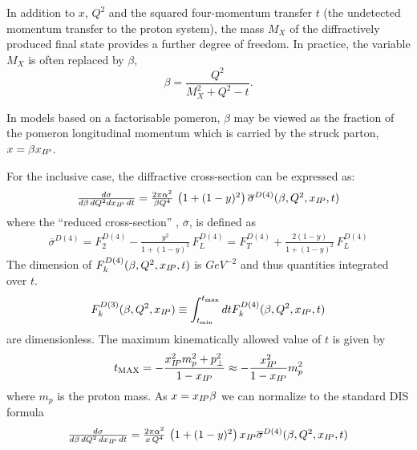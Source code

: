 In addition to $x$, $Q^2$ and the squared four-momentum transfer $t$
(the undetected momentum transfer to the proton system),
the mass $M_X$ of the diffractively produced final state provides
 a further degree of freedom. In practice, the variable $M_X$ is often replaced by $\beta$,
\begin{equation}
\beta=\frac{Q^2}{M_X^2+Q^2-t}.
\end{equation}

In models based on a factorisable pomeron, $\beta$ may be viewed as the fraction of the
pomeron longitudinal momentum which is carried by the struck parton, $x=\beta x_{{I\!P}}$.

For the inclusive case, the diffractive cross-section can be expressed as:
\begin{equation}
\begin{array}{lcl}
  \frac{d\sigma}{d\beta\,dQ^2dx_{{I\!P}}\,dt}
=
  \frac{2\pi\alpha^2}{\beta Q^4}\,
    \left( 1 +  (1-y)^2 \right) \overline\sigma^{D(4)}(\beta,Q^2,x_{{I\!P}},t)
\label{Dxs}
\end{array}
\end{equation}
where the ``reduced cross-section'' , $\overline\sigma$, is defined as
\begin{equation}
\begin{array}{lcl}
\overline\sigma^{D(4)}
 = F_2^{D(4)} - \frac{y^2}{1 +  (1-y)^2}\, F_L^{D(4)}
 = F_T^{D(4)} + \frac{2(1-y)}{1 +  (1-y)^2}\, F_L^{D(4)}
\label{eq:sigred}
\end{array}
\end{equation}
The dimension of $F_k^{D(4)}(\beta,Q^2,x_{{I\!P}},t)$
is $GeV^{-2}$ and thus quantities integrated over $t$.
\begin{equation}
F_k^{D(3)}(\beta,Q^2,x_{{I\!P}})
\equiv
\int_{t_{\rm min}}^{t_{\rm max}} dt
F_k^{D(4)}(\beta,Q^2,x_{{I\!P}},t)
\end{equation}
are dimensionless. The maximum kinematically allowed value of $t$ is given by
\begin{equation}
t_{\rm MAX} 
=
-\frac{x_{{I\!P}}^2 m_p^2 + p_\perp^2}{1-x_{{I\!P}}}
\approx 
-\frac{x_{{I\!P}}^2}{1-x_{{I\!P}}} m_p^2
\end{equation}
where $m_p$ is the proton mass.
As $x = x_{{I\!P}}\beta$ we can normalize to the standard DIS formula
\begin{equation}
\begin{array}{lcl}
\frac{d\sigma}{d\beta\,dQ^2\,dx_{{I\!P}}\,dt} =
  \frac{2\pi\alpha^2}{x\, Q^4}\,
    \left( 1 +  (1-y)^2 \right) x_{{I\!P}}\overline\sigma^{D(4)}(\beta,Q^2,x_{{I\!P}},t)
\end{array}
\end{equation}
